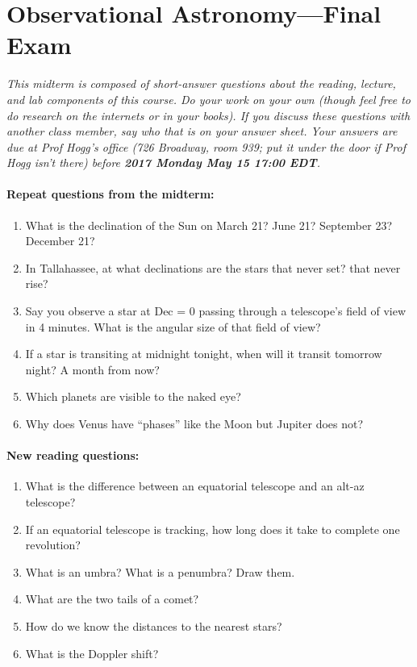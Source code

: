 \documentclass[12pt]{article}
\begin{document}
\section*{Observational Astronomy---Final Exam}

\textsl{This midterm is composed of short-answer questions about the
  reading, lecture, and lab components of this course. Do your work on
  your own (though feel free to do research on the internets or in
  your books). If you discuss these questions with another class
  member, say who that is on your answer sheet. Your answers are due
  at Prof Hogg's office (726 Broadway, room 939; put it under the door
  if Prof Hogg isn't there) before \textbf{2017 Monday May 15 17:00
    EDT}.}

\paragraph{Repeat questions from the midterm:}
\begin{enumerate}
\item  What is the declination of the Sun on March 21? June 21?
  September 23? December 21?
\item In Tallahassee, at what declinations are the stars that never set?
  that never rise?
\item Say you observe a star at Dec = 0 passing through a telescope's
  field of view in 4 minutes. What is the angular size of that field
  of view?
\item If a star is transiting at midnight tonight, when will it
  transit tomorrow night? A month from now?
\item Which planets are visible to the naked eye?
\item Why does Venus have ``phases'' like the Moon but Jupiter does
  not?
\end{enumerate}

\paragraph{New reading questions:}
\begin{enumerate}[resume]
\item What is the difference between an equatorial telescope and an
  alt-az telescope?
\item If an equatorial telescope is tracking, how long does it take to
  complete one revolution?
\item What is an umbra? What is a penumbra? Draw them.
\item What are the two tails of a comet?
\item How do we know the distances to the nearest stars?
\item What is the Doppler shift?
\end{enumerate}
\end{document}
